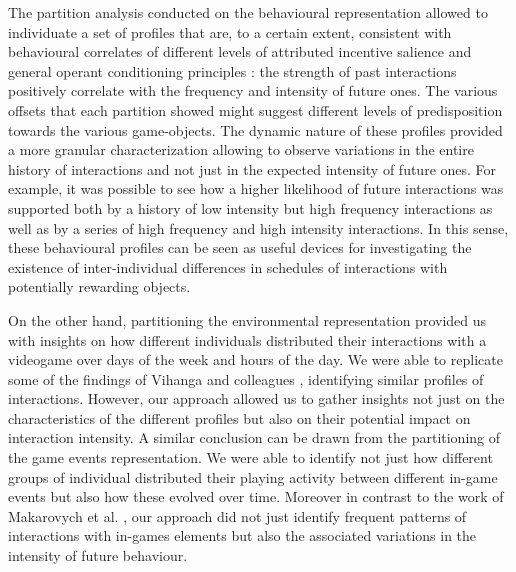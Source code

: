 The partition analysis conducted on the behavioural representation allowed to individuate a set of profiles that are, to a certain extent, consistent with behavioural correlates of different levels of attributed incentive salience \cite{berridge2004motivation} and general operant conditioning principles \cite{thorndike1927law, skinner1953science, nevin2000behavioral}: the strength of past interactions positively correlate with the frequency and intensity of future ones. The various offsets that each partition showed might suggest different levels of predisposition towards the various game-objects. The dynamic nature of these profiles provided a more granular characterization allowing to observe variations in the entire history of interactions and not just in the expected intensity of future ones. For example, it was possible to see how a higher likelihood of future interactions was supported both by a history of low intensity but high frequency interactions as well as by a series of high frequency and high intensity interactions. In this sense, these behavioural profiles can be seen as useful devices for investigating the existence of inter-individual differences in schedules of interactions with potentially rewarding objects. 

On the other hand, partitioning the environmental representation provided us with insights on how different individuals distributed their interactions with a videogame over days of the week and hours of the day. We were able to replicate some of the findings of Vihanga and colleagues \cite{vihanga2019weekly, wannigamage2021player}, identifying similar profiles of interactions. However, our approach allowed us to gather insights not just on the characteristics of the different profiles but also on their potential impact on interaction intensity. A similar conclusion can be drawn from the partitioning of the game events representation. We were able to identify not just  how different groups of individual distributed their playing activity between different in-game events but also how these evolved over time. Moreover in contrast to the work of Makarovych et al. \cite{makarovych2018like}, our approach did not just identify frequent patterns of interactions with in-games elements but also the associated variations in the intensity of future behaviour.
